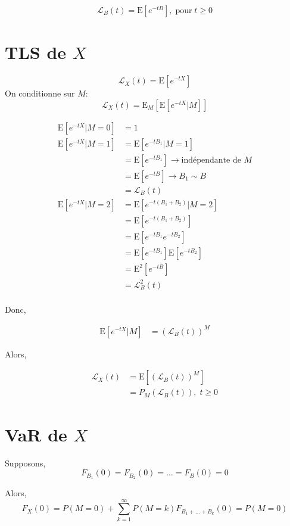 \documentclass[]{book}
\theoremstyle{definition}
\theoremstyle{definition}
\theoremstyle{definition}
\theoremstyle{remark}
\begin{document}
\[
\mathcal{L}_B(t)=\text{E}[e^{-tB}],\;\text{pour}\;t\geq 0
\]

\section{\texorpdfstring{TLS de \(X\)}{TLS de X}}\label{tls-de-x}

\[
\mathcal{L}_X(t)=\text{E}[e^{-tX}]
\] On conditionne sur \(M\): \[
\mathcal{L}_X(t)= \text{E}_M\left [\text{E}[e^{-tX}|M]\right ]
\]

\begin{align*}
\text{E}[e^{-tX}|M=0]& =1\\
\text{E}[e^{-tX}|M=1]& =\text{E}[e^{-tB_1}|M=1]\\
& = \text{E}[e^{-tB_1}] \rightarrow \text{indépendante de }M\\
& = \text{E}[e^{-tB}] \rightarrow B_1 \sim B\\
& = \mathcal{L}_B(t)\\
\text{E}[e^{-tX}|M=2]& = \text{E}[e^{-t(B_1+B_2)}|M=2]\\
& = \text{E}[e^{-t(B_1+B_2)}]\\
& =\text{E}[e^{-tB_1} e^{-tB_2}]\\
& =\text{E}[e^{-tB_1}]\text{E}[e^{-tB_2}]\\
& =\text{E}^2[e^{-tB}]\\
& = \mathcal{L}_B^2(t)\\
\end{align*}

Donc,

\begin{align*}
\text{E}[e^{-tX}|M]& =\left (\mathcal{L}_B(t)\right )^M
\end{align*}

Alors,

\begin{align*}
\mathcal{L}_X(t)& =\text{E}\left [\left (\mathcal{L}_B(t)\right )^M \right ]\\
& = P_M\left (\mathcal{L}_B(t)\right ),\;t \geq 0
\end{align*}

\section{\texorpdfstring{VaR de \(X\)}{VaR de X}}\label{var-de-x}

Supposons, \[F_{B_1}(0)=F_{B_2}(0)=\dots=F_B(0)=0\]

Alors, \[
F_X(0) = P(M=0)+\sum^\infty_{k=1} P(M=k)F_{B_1+\dots+B_k}(0)=P(M=0) 
\]
\end{document}

